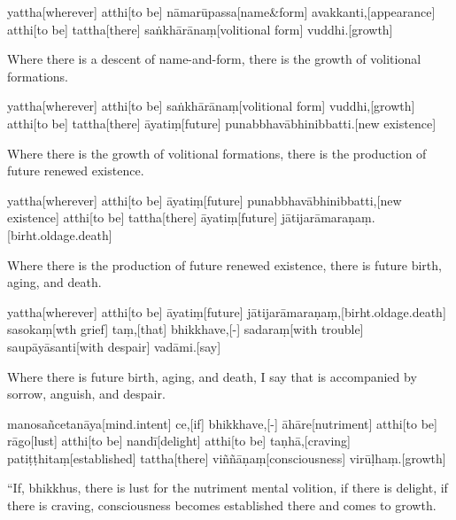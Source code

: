 \begin{samepage}
\begingl[glneveryline={\PaliGlossA,\PaliGlossB}]
yattha[wherever] atthi[to be] nāmarūpassa[name\&form] avakkanti,[appearance] atthi[to be] tattha[there] saṅkhārānaṃ[volitional form] vuddhi.[growth]
\endgl
\nopagebreak
\linespread{0.5}
\begin{spacin}{0.2}
{\PaliGlossFT Where there is a descent of name-and-form, there is the growth of volitional formations.}
\end{spacin}
\vskip 12pt
\end{samepage}
\begin{samepage}
\begingl[glneveryline={\PaliGlossA,\PaliGlossB}]
yattha[wherever] atthi[to be] saṅkhārānaṃ[volitional form] vuddhi,[growth] atthi[to be] tattha[there] āyatiṃ[future] punabbhavābhinibbatti.[new existence]
\endgl
\nopagebreak
\linespread{0.5}
\begin{spacin}{0.2}
{\PaliGlossFT Where there is the growth of volitional formations, there is the production of future renewed existence.}
\end{spacin}
\vskip 12pt
\end{samepage}
\begin{samepage}
\begingl[glneveryline={\PaliGlossA,\PaliGlossB}]
yattha[wherever] atthi[to be] āyatiṃ[future] punabbhavābhinibbatti,[new existence] atthi[to be] tattha[there] āyatiṃ[future] jātijarāmaraṇaṃ.[birht.oldage.death]
\endgl
\nopagebreak
\linespread{0.5}
\begin{spacin}{0.2}
{\PaliGlossFT Where there is the production of future renewed existence, there is future birth, aging, and death.}
\end{spacin}
\vskip 12pt
\end{samepage}
\begin{samepage}
\begingl[glneveryline={\PaliGlossA,\PaliGlossB}]
yattha[wherever] atthi[to be] āyatiṃ[future] jātijarāmaraṇaṃ,[birht.oldage.death] sasokaṃ[wth grief] taṃ,[that] bhikkhave,[-] sadaraṃ[with trouble] saupāyāsanti[with despair] vadāmi.[say]
\endgl
\nopagebreak
\linespread{0.5}
\begin{spacin}{0.2}
{\PaliGlossFT Where there is future birth, aging, and death, I say that is accompanied by sorrow, anguish, and despair.}
\end{spacin}
\vskip 12pt
\end{samepage}
\vskip 0.2in
\begin{samepage}
\begingl[glneveryline={\PaliGlossA,\PaliGlossB}]
manosañcetanāya[mind.intent] ce,[if] bhikkhave,[-] āhāre[nutriment] atthi[to be] rāgo[lust] atthi[to be] nandī[delight] atthi[to be] taṇhā,[craving] patiṭṭhitaṃ[established] tattha[there] viññāṇaṃ[consciousness] virūḷhaṃ.[growth]
\endgl
\nopagebreak
\linespread{0.5}
\begin{spacin}{0.2}
{\PaliGlossFT “If, bhikkhus, there is lust for the nutriment mental volition, if there is delight, if there is craving, consciousness becomes established there and comes to growth.}
\end{spacin}
\vskip 12pt
\end{samepage}
